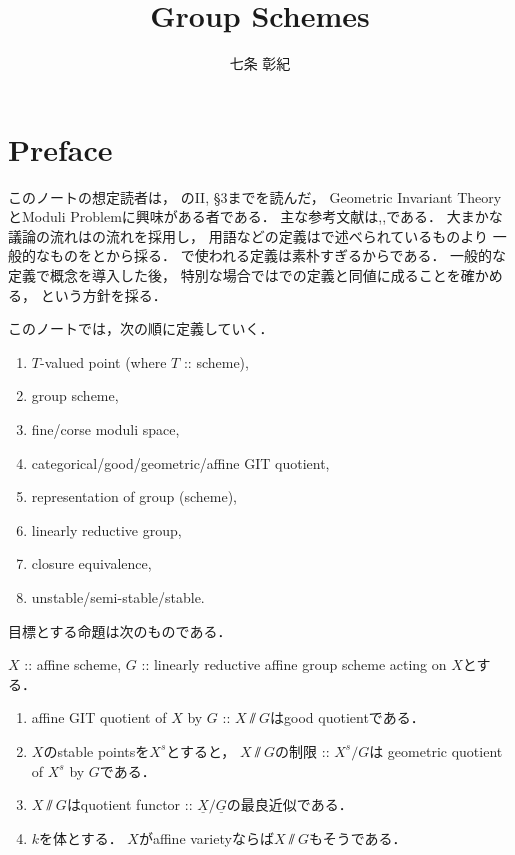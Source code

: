 \documentclass[a4paper]{jsarticle}
\newcommand{\func}[1]{\underline{#1}}
\begin{document}
\title{Group Schemes}
\author{七条 彰紀}
\maketitle
\tableofcontents

\section{Preface}
    このノートの想定読者は，
    \cite{HarAG}のII, \S 3までを読んだ，
    Geometric Invariant TheoryとModuli Problemに興味がある者である．
    主な参考文献は\cite{Muk1},\cite{AV},\cite{Hos}である．
    大まかな議論の流れは\cite{Muk1}の流れを採用し，
    用語などの定義は\cite{Muk1}で述べられているものより
    一般的なものを\cite{AV}と\cite{Hos}から採る．
    \cite{Muk1}で使われる定義は素朴すぎるからである．
    一般的な定義で概念を導入した後，
    特別な場合では\cite{Muk1}での定義と同値に成ることを確かめる，
    という方針を採る．

    このノートでは，次の順に定義していく．
    \begin{enumerate}
        \item $T$-valued point (where $T$ :: scheme),
        \item group scheme,
        \item fine/corse moduli space,
        \item categorical/good/geometric/affine GIT quotient,
        \item representation of group (scheme),
        \item linearly reductive group,
        \item closure equivalence,
        \item unstable/semi-stable/stable.
    \end{enumerate}

    目標とする命題は次のものである．
    \begin{Thm}
        $X$ :: affine scheme,
        $G$ :: linearly reductive affine group scheme acting on $X$とする．
        \begin{enumerate}[label=(\roman*), leftmargin=*]
        \item 
        affine GIT quotient of $X$ by $G$ :: $X \sslash G$はgood quotientである．

        \item
        $X$のstable pointsを$X^s$とすると，
        $X \sslash G$の制限 :: $X^s \slash G$は
        geometric quotient of $X^s$ by $G$である．

        \item
        $X \sslash G$はquotient functor :: $\func{X} \slash \func{G}$の最良近似である．

        \item
        $k$を体とする．
        $X$がaffine varietyならば$X \sslash G$もそうである．
        \end{enumerate}
    \end{Thm}
\end{document}
